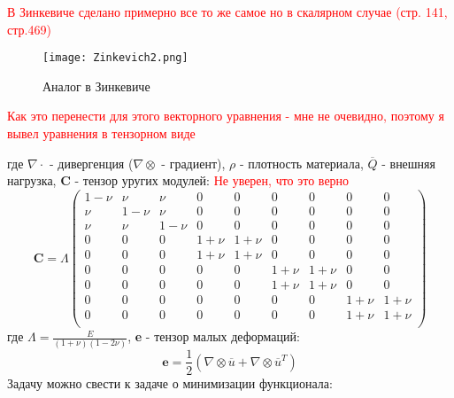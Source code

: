 \documentclass[a4paper,12pt]{article}
\begin{document}
\textcolor{red}{В Зинкевиче сделано примерно все то же самое но в скалярном случае (стр. 141, стр.469)}
\begin{figure}[H]
    \texttt{[image: Zinkevich2.png]}
    \caption{Аналог в Зинкевиче}
    \label{fig:enter-label}
\end{figure}
\textcolor{red}{Как это перенести для этого векторного уравнения - мне не очевидно, поэтому я вывел уравнения в тензорном виде} \par
где $\nabla \cdot$ - дивергенция ($\nabla \otimes $ - градиент), $\rho$ - плотность материала, $\overline{Q}$ - внешняя нагрузка, $\textbf{C}$ - тензор уругих модулей: \textcolor{red}{Не уверен, что это верно}
\begin{equation}
\textbf{C} = \Lambda
\begin{pmatrix}
    1-\nu & \nu & \nu &  0 & 0 &0 &0 &0 & 0 \\
    \nu & 1-\nu & \nu & 0 & 0 & 0 & 0&0 &0 \\
    \nu & \nu & 1-\nu & 0&0&0&0&0&0\\
    0 & 0 & 0 & 1+\nu & 1+\nu & 0 &0 &0&0 \\
    0 & 0 & 0 & 1+\nu & 1+\nu & 0 &0 &0&0 \\
    0&0 &0 &0 &0 &1+\nu &1+\nu &0 &0 \\
    0&0 &0 &0 &0 &1+\nu &1+\nu &0 &0 \\
    0&0 &0 &0 &0 &0 &0 &1+\nu &1+\nu \\
    0&0 &0 &0 &0 &0 &0 &1+\nu &1+\nu \\
    
\end{pmatrix}
\end{equation}
где $\Lambda = \frac{E}{(1+\nu)(1-2\nu)}$, \textbf{e} - тензор малых деформаций:
\begin{equation}
    \textbf{e} = \frac{1}{2}(\nabla \otimes \overline{u} + \nabla \otimes \overline{u}^T)
\end{equation}
Задачу можно свести к задаче о минимизации функционала:

        
\end{document}
